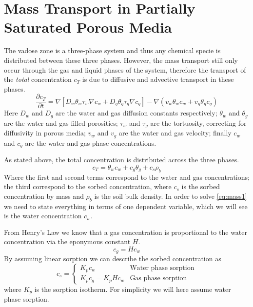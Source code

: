 \documentclass{article}
\begin{document}
\section{Mass Transport in Partially Saturated Porous Media}

The vadose zone is a three-phase system and thus any chemical specie is distributed between these three phases.
However, the mass transport still only occur through the gas and liquid phases of the system, therefore the transport of the \textit{total} concentration $c_T$ is due to diffusive and advective transport in these phases.
\begin{equation}\label{eq:mass1}
  \frac{\partial c_T}{\partial t} = \nabla [D_w \theta_w \tau_w \nabla c_w + D_g \theta_g \tau_g \nabla c_g]
    - \nabla (v_w \theta_w c_w + v_g \theta_g c_g)
\end{equation}
Here $D_w$ and $D_g$ are the water and gas diffusion constants respectively; $\theta_w$ and $\theta_g$ are the water and gas filled porosities; $\tau_w$ and $\tau_g$ are the tortuosity, correcting for diffusivity in porous media; $v_w$ and $v_g$ are the water and gas velocity; finally $c_w$ and $c_g$ are the water and gas phase concentrations.\par

As stated above, the total concentration is distributed across the three phases.
\begin{equation}
  c_T = \theta_w c_w + c_g \theta_g + c_s \rho_b
\end{equation}
Where the first and second terms correspond to the water and gas concentrations; the third correspond to the sorbed concentration, where $c_s$ is the sorbed concentration by mass and $\rho_b$ is the soil bulk density.
In order to solve \eqref{eq:mass1} we need to state everything in terms of one dependent variable, which we will see is the water concentration $c_w$.

From Henry's Law we know that a gas concentration is proportional to the water concentration via the eponymous constant $H$.
\begin{equation}
  c_g = H c_w
\end{equation}
By assuming linear sorption we can describe the sorbed concentration as
\begin{equation}
  c_s = \begin{cases}
    K_p c_w &\text{Water phase sorption} \\
    K_p c_g = K_p H c_w &\text{Gas phase sorption}
  \end{cases}
\end{equation}
where $K_p$ is the sorption isotherm.
For simplicity we will here assume water phase sorption.
\end{document}

